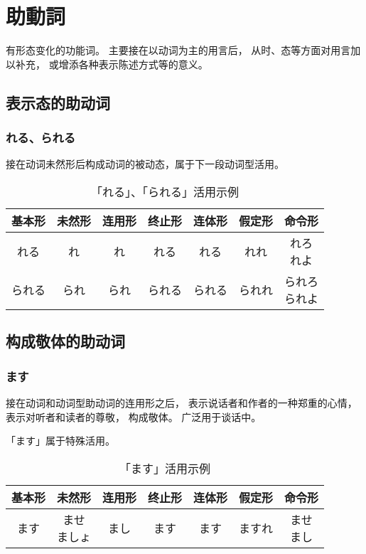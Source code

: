 \section{助動詞}%

有形态变化的功能词。
主要接在以动词为主的用言后，
从时、态等方面对用言加以补充，
或增添各种表示陈述方式等的意义。

\subsection{表示态的助动词}%

\subsubsection{れる、られる}%

接在动词未然形后构成动词的被动态，属于下一段动词型活用。

\begin{table}[h]
  \centering
  \caption{「れる」、「られる」活用示例}
  \begin{tabular}{c c c c c c c}
    基本形 & 未然形 & 连用形 & 终止形 & 连体形 & 假定形 & 命令形 \\
    \hline
    れる & れ & れ & れる & れる & れれ & \makecell{れろ \\ れよ} \\
    られる & られ & られ & られる & られる & られれ & \makecell{られろ \\ られよ} \\
  \end{tabular}
\end{table}


\subsection{构成敬体的助动词}%

\subsubsection{ます}%

接在动词和动词型助动词的连用形之后，
表示说话者和作者的一种郑重的心情，
表示对听者和读者的尊敬，
构成敬体。
广泛用于谈话中。

「ます」属于特殊活用。

\begin{table}[h]
  \centering
  \caption{「ます」活用示例}
  \begin{tabular}{c c c c c c c}
    基本形 & 未然形 & 连用形 & 终止形 & 连体形 & 假定形 & 命令形 \\
    \hline
    ます & \makecell{ませ \\ ましょ} & まし & ます & ます & ますれ & \makecell{ませ \\ まし} \\
  \end{tabular}
\end{table}

